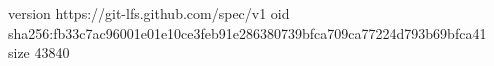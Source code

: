 version https://git-lfs.github.com/spec/v1
oid sha256:fb33c7ac96001e01e10ce3feb91e286380739bfca709ca77224d793b69bfca41
size 43840
